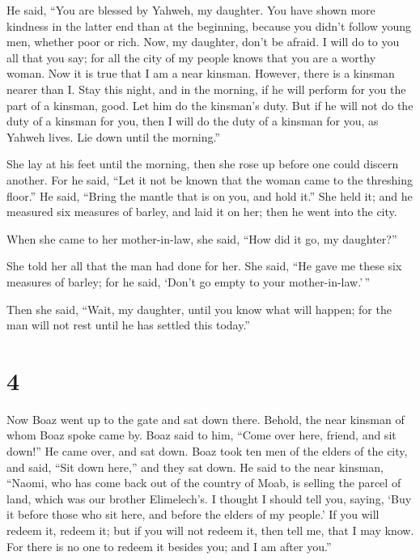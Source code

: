  He said, ``You are blessed by Yahweh, my daughter. You
have shown more kindness in the latter end than at the beginning,
because you didn't follow young men, whether poor or rich. 
Now, my daughter, don't be afraid. I will do to you all that you say;
for all the city of my people knows that you are a worthy woman.
 Now it is true that I am a near kinsman. However, there is
a kinsman nearer than I.  Stay this night, and in the
morning, if he will perform for you the part of a kinsman, good. Let him
do the kinsman's duty. But if he will not do the duty of a kinsman for
you, then I will do the duty of a kinsman for you, as Yahweh lives. Lie
down until the morning.''

 She lay at his feet until the morning, then she rose up
before one could discern another. For he said, ``Let it not be known
that the woman came to the threshing floor.''  He said,
``Bring the mantle that is on you, and hold it.'' She held it; and he
measured six measures of barley, and laid it on her; then he went into
the city.

 When she came to her mother-in-law, she said, ``How did it
go, my daughter?''

She told her all that the man had done for her.  She said,
``He gave me these six measures of barley; for he said, `Don't go empty
to your mother-in-law.'\,''

 Then she said, ``Wait, my daughter, until you know what
will happen; for the man will not rest until he has settled this
today.''

\hypertarget{section-3}{%
\section{4}\label{section-3}}

 Now Boaz went up to the gate and sat down there. Behold,
the near kinsman of whom Boaz spoke came by. Boaz said to him, ``Come
over here, friend, and sit down!'' He came over, and sat down.
 Boaz took ten men of the elders of the city, and said,
``Sit down here,'' and they sat down.  He said to the near
kinsman, ``Naomi, who has come back out of the country of Moab, is
selling the parcel of land, which was our brother Elimelech's.
 I thought I should tell you, saying, `Buy it before those
who sit here, and before the elders of my people.' If you will redeem
it, redeem it; but if you will not redeem it, then tell me, that I may
know. For there is no one to redeem it besides you; and I am after
you.''

